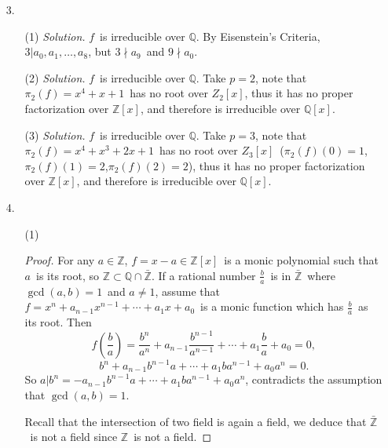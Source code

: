 \documentclass[12pt]{article}
\newcommand{\Z}{\mathbb{Z}}
\newcommand{\Q}{\mathbb{Q}}
\begin{document}
\begin{enumerate}
	\item[3.]
	\begin{enumerate}
		\item[(1)]
		\textit{Solution.}
		    $f$\ is irreducible over $\Q$. By Eisenstein's Criteria, $3|a_0,a_1,\ldots,a_8$, but $3\nmid a_9$\ and $9\nmid a_0$.
		\item[(2)]
		\textit{Solution.}
		    $f$\ is irreducible over $\Q$. Take $p=2$, note that $\pi_2(f)=x^4+x+1$\ has no root over $Z_2[x]$, thus it has no proper factorization over $\Z[x]$, and therefore is irreducible over $\Q[x]$.
		\item[(3)]
		\textit{Solution.}
		    $f$\ is irreducible over $\Q$. Take $p=3$, note that $\pi_2(f)=x^4+x^3+2x+1$\ has no root over $Z_3[x]$\ ($\pi_2(f)(0)=1$,$\pi_2(f)(1)=2$,$\pi_2(f)(2)=2$), thus it has no proper factorization over $\Z[x]$, and therefore is irreducible over $\Q[x]$.
	\end{enumerate}
	\item[4.]
	\begin{enumerate}
		\item[(1)]
		\begin{proof}
		    For any $a\in\Z$, $f=x-a\in\Z[x]$\ is a monic polynomial such that $a$\ is its root, so $\Z\subset\Q\cap\bar{\Z}$. If a rational number $\frac{b}{a}$\ is in $\bar{\Z}$\ where $\gcd(a,b)=1$\ and $a\neq1$, assume that $f=x^n+a_{n-1}x^{n-1}+\cdots+a_1x+a_0$\ is a monic function which has $\frac{b}{a}$\ as its root. Then
		    $$f(\frac{b}{a})=\frac{b^n}{a^n}+a_{n-1}\frac{b^{n-1}}{a^{n-1}}+\cdots+a_1\frac{b}{a}+a_0=0,$$
		    $$b^n+a_{n-1}b^{n-1}a+\cdots+a_1ba^{n-1}+a_0a^n=0.$$
		    So $a|b^n=-a_{n-1}b^{n-1}a+\cdots+a_1ba^{n-1}+a_0a^n$, contradicts the assumption that $\gcd(a,b)=1$.\par
		    \quad Recall that the intersection of two field is again a field, we deduce that $\bar{\Z}$\ is not a field since $\Z$\ is not a field.
		\end{proof}

\end{enumerate}
\end{enumerate}
\end{document}

